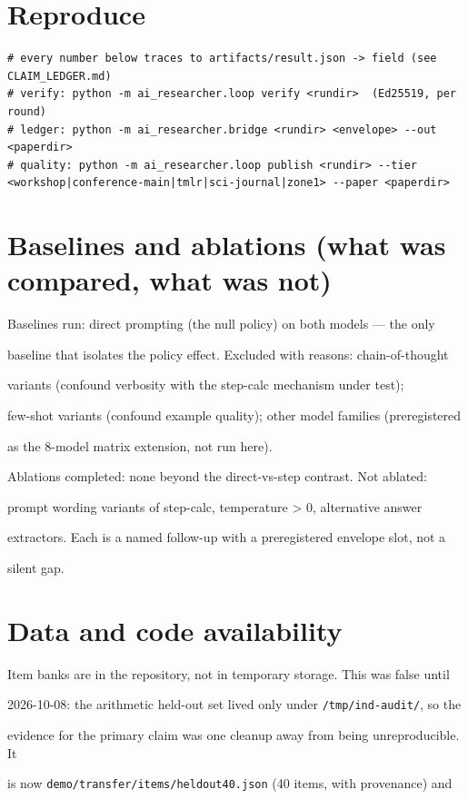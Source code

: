 \documentclass[11pt]{article}
\begin{document}
\section*{Reproduce}
\begin{verbatim}
# every number below traces to artifacts/result.json -> field (see CLAIM_LEDGER.md)
# verify: python -m ai_researcher.loop verify <rundir>  (Ed25519, per round)
# ledger: python -m ai_researcher.bridge <rundir> <envelope> --out <paperdir>
# quality: python -m ai_researcher.loop publish <rundir> --tier <workshop|conference-main|tmlr|sci-journal|zone1> --paper <paperdir>
\end{verbatim}

\section*{Baselines and ablations (what was compared, what was not)}

Baselines run: direct prompting (the null policy) on both models --- the only

baseline that isolates the policy effect. Excluded with reasons: chain-of-thought

variants (confound verbosity with the step-calc mechanism under test);

few-shot variants (confound example quality); other model families (preregistered

as the 8-model matrix extension, not run here).


Ablations completed: none beyond the direct-vs-step contrast. Not ablated:

prompt wording variants of step-calc, temperature > 0, alternative answer

extractors. Each is a named follow-up with a preregistered envelope slot, not a

silent gap.


\section*{Data and code availability}

Item banks are in the repository, not in temporary storage. This was false until

2026-10-08: the arithmetic held-out set lived only under \texttt{/tmp/ind-audit/}, so the

evidence for the primary claim was one cleanup away from being unreproducible. It

is now \texttt{demo/transfer/items/heldout40.json} (40 items, with provenance) and
\end{document}
